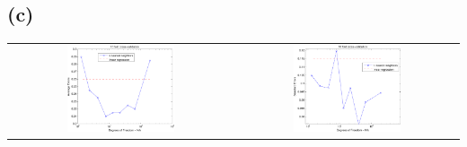 \documentclass[pra,groupedaddress,amsmath,amssymb, column]{revtex4}
\begin{document}
\subsection*{(c)}
\begin{center}
\begin{tabular}{cc}
\includegraphics[width=0.5\textwidth]{Q1c1.pdf} &
\includegraphics[width=0.5\textwidth]{Q1c2.pdf}
\end{tabular}
\end{center}
\end{document}

